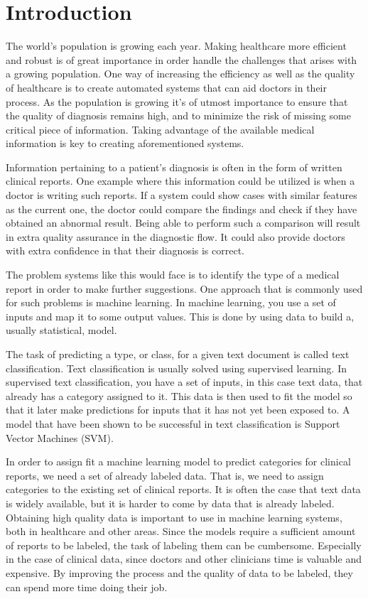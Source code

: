 \chapter{Introduction}
\label{cha:introduction}

The world's population is growing each year. 
Making healthcare more efficient and robust is of great importance in order handle the challenges that arises with a growing population.
One way of increasing the efficiency as well as the quality of healthcare is to create automated systems that can aid doctors in their process.
As the population is growing it's of utmost importance to ensure that the quality of diagnosis remains high, and to minimize the risk of missing some critical piece of information.
Taking advantage of the available medical information is key to creating aforementioned systems.

Information pertaining to a patient's diagnosis is often in the form of written clinical reports.
One example where this information could be utilized is when a doctor is writing such reports.
If a system could show cases with similar features as the current one, the doctor could compare the findings and check if they have obtained an abnormal result.
Being able to perform such a comparison will result in extra quality assurance in the diagnostic flow.
It could also provide doctors with extra confidence in that their diagnosis is correct.

The problem systems like this would face is to identify the type of a medical report in order to make further suggestions.
One approach that is commonly used for such problems is machine learning.
In machine learning, you use a set of inputs and map it to some output values. %
This is done by using data to build a, usually statistical, model.

The task of predicting a type, or class, for a given text document is called text classification.
Text classification is usually solved using supervised learning. %
In supervised text classification, you have a set of inputs, in this case text data, that already has a category assigned to it.
This data is then used to fit the model so that it later make predictions for inputs that it has not yet been exposed to.
A model that have been shown to be successful in text classification is Support Vector Machines (SVM). %

In order to assign fit a machine learning model to predict categories for clinical reports, we need a set of already labeled data.
That is, we need to assign categories to the existing set of clinical reports.
It is often the case that text data is widely available, but it is harder to come by data that is already labeled.
Obtaining high quality data is important to use in machine learning systems, both in healthcare and other areas.
Since the models require a sufficient amount of reports to be labeled, the task of labeling them can be cumbersome.
Especially in the case of clinical data, since doctors and other clinicians time is valuable and expensive.
By improving the process and the quality of data to be labeled, they can spend more time doing their job.

